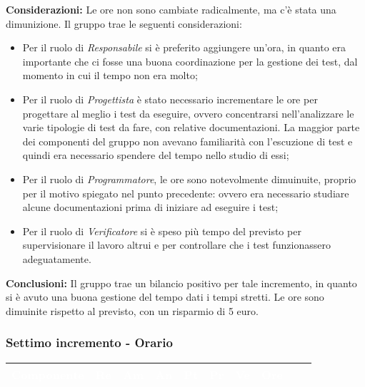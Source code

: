 {{{                \textbf{Considerazioni:} Le ore non sono cambiate radicalmente, ma c'è stata una dimunizione. Il gruppo trae le seguenti considerazioni:
                \begin{itemize}
                    \item Per il ruolo di \textit{Responsabile} si è preferito aggiungere un'ora, in quanto era importante che ci fosse una buona coordinazione per la gestione
                    dei test, dal momento in cui il tempo non era molto;
                    \item Per il ruolo di \textit{Progettista} è stato necessario incrementare le ore per progettare al meglio i test da eseguire, 
                    ovvero concentrarsi nell'analizzare le varie tipologie di test da fare, con relative documentazioni. La maggior parte dei componenti del gruppo
                    non avevano familiarità con l'escuzione di test e quindi era necessario spendere del tempo nello studio di essi;
                    \item Per il ruolo di \textit{Programmatore}, le ore sono notevolmente dimuinuite, proprio per il motivo spiegato nel punto precedente: ovvero era necessario studiare
                    alcune documentazioni prima di iniziare ad eseguire i test;
                    \item Per il ruolo di \textit{Verificatore} si è speso più tempo del previsto per supervisionare il lavoro altrui e per controllare che i test funzionassero adeguatamente.
                \end{itemize} 
                \textbf{Conclusioni:} Il gruppo trae un bilancio positivo per tale incremento, in quanto si è avuto una buona gestione del tempo dati i tempi stretti. 
                Le ore sono dimuinite rispetto al previsto, con un risparmio di 5 euro.
            }
            \subsubsection{Settimo incremento - Orario} {
                \setlength{\freewidth}{\dimexpr\textwidth-30\tabcolsep}
            \renewcommand{\arraystretch}{1.0}
            \setlength{\aboverulesep}{0pt}
            \setlength{\belowrulesep}{0pt}
            \begin{longtable}{C{.3\freewidth} C{.1\freewidth} C{.1\freewidth} C{.1\freewidth} C{.1\freewidth} C{.1\freewidth} C{.1\freewidth} C{.1\freewidth} C{.1\freewidth} C{.3\freewidth}}
            \toprule
            \textcolor{white}{\textbf{Componente}}&
            \textcolor{white}{\textbf{Re}}&
            \textcolor{white}{\textbf{Am}}&
            \textcolor{white}{\textbf{An}}&
            \textcolor{white}{\textbf{Pt}}&
            \textcolor{white}{\textbf{Pr}}&
            \textcolor{white}{\textbf{Ve}}&
            \textcolor{white}{\textbf{Ore}} \\
            \toprule
            \endhead
    

\end{longtable}}}}
